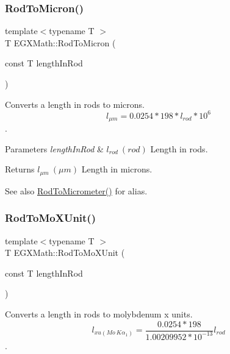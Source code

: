 \subsubsection{\texorpdfstring{Rod\+To\+Micron()}{RodToMicron()}}
{\footnotesize\ttfamily template$<$typename T $>$ \\
T E\+G\+X\+Math\+::\+Rod\+To\+Micron (\begin{DoxyParamCaption}\item[{const T}]{length\+In\+Rod }\end{DoxyParamCaption})}



Converts a length in rods to microns. \[ l_{\mu m}=0.0254 * 198 * l_{rod} * 10^{6} \]. 


\begin{DoxyParams}{Parameters}
{\em length\+In\+Rod} & $ l_{rod}\ (rod)$ Length in rods. \\
\hline
\end{DoxyParams}
\begin{DoxyReturn}{Returns}
$ l_{\mu m}\ (\mu m)$ Length in microns. 
\end{DoxyReturn}
\begin{DoxySeeAlso}{See also}
\mbox{\hyperlink{group___e_g_x_math-_conversions-_length_conversions-_surveyors-_rod-_s_i_ga8821e67ddd408e4b4b9c4d1512b6a9d8}{Rod\+To\+Micrometer()}} for alias. 
\end{DoxySeeAlso}
\mbox{\label{group___e_g_x_math-_conversions-_length_conversions-_surveyors-_rod-_non-_s_i_gac5c3c27eea891ef32353d16c6b8c57ab}} 
\subsubsection{\texorpdfstring{Rod\+To\+Mo\+X\+Unit()}{RodToMoXUnit()}}
{\footnotesize\ttfamily template$<$typename T $>$ \\
T E\+G\+X\+Math\+::\+Rod\+To\+Mo\+X\+Unit (\begin{DoxyParamCaption}\item[{const T}]{length\+In\+Rod }\end{DoxyParamCaption})}



Converts a length in rods to molybdenum x units. \[ l_{xu(Mo\ K\alpha_1)}=\frac{0.0254 * 198}{1.00209952*10^{-13}} l_{rod}\]. 


